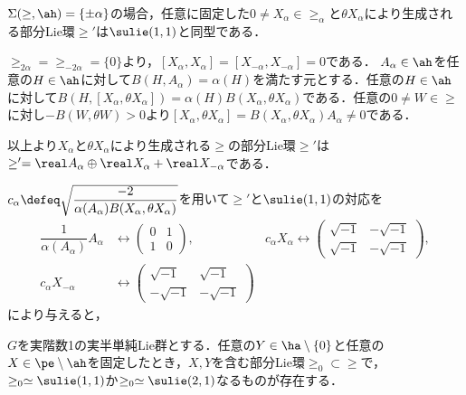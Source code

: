 \begin{lem}\label{lem:su11}
  
  $\Sigma(\ge,\ah) = \{\pm\alpha\}$の場合，任意に固定した$0\neq X_{\alpha}\in \ge_{\alpha}$と$\theta X_{\alpha}$により生成される部分Lie環$\ge'$は$\sulie(1,1)$と同型である．
\end{lem}

\begin{npfwn}
  $\ge_{2\alpha} = \ge_{-2\alpha} = \{0\}  $より，$[X_{\alpha}, X_{\alpha}] = [X_{-\alpha}, X_{-\alpha}] = 0 $である． $A_{\alpha}\in \ah $を任意の$H\in \ah$に対して$B(H,A_{\alpha}) = \alpha(H) $を満たす元とする．任意の$H\in \ah$に対して$B(H, [X_{\alpha}, \theta X_{\alpha}]) = \alpha(H) B(X_{\alpha}, \theta X_{\alpha}) $である．任意の$0\neq W\in \ge$に対し$-B(W,\theta W) > 0 $より$[X_{\alpha}, \theta X_{\alpha}] = B(X_{\alpha}, \theta X_{\alpha})A_{\alpha}\neq 0 $である．

  以上より$X_{\alpha} $と$\theta X_{\alpha} $により生成される$\ge$の部分Lie環$\ge'$は$\ge' = \real A_{\alpha}\oplus \real X_{\alpha} + \real X_{-\alpha}  $である．

  $c_{\alpha}\defeq \sqrt{\dfrac{-2}{\alpha(A_{\alpha})B(X_{\alpha}, \theta X_{\alpha})}} $を用いて$\ge'$と$\sulie(1,1)$の対応を
  \begin{align*}
    \dfrac{1}{\alpha(A_{\alpha})} A_{\alpha} &\leftrightarrow
    \begin{pmatrix}
      0 & 1 \\ 1 & 0
    \end{pmatrix},& c_{\alpha} X_{\alpha} \leftrightarrow
      \begin{pmatrix}
        \sqrt{-1} & -\sqrt{-1} \\ \sqrt{-1} & -\sqrt{-1}
      \end{pmatrix},\\
    c_{\alpha} X_{-\alpha} &\leftrightarrow
      \begin{pmatrix}
        \sqrt{-1} & \sqrt{-1} \\ -\sqrt{-1} & -\sqrt{-1}
      \end{pmatrix} 
  \end{align*}
  により与えると，
\end{npfwn}

\begin{cor}\label{cor:sub-lie-alg}
  $G$を実階数1の実半単純Lie群とする．任意の$Y\in \ha\setminus\{0\} $と任意の$X\in \pe\setminus \ah$を固定したとき，$X,Y$を含む部分Lie環$\ge_0\subset \ge$で，$\ge_0\simeq \sulie(1,1) $か$\ge_0\simeq \sulie(2,1)$なるものが存在する．
\end{cor}

